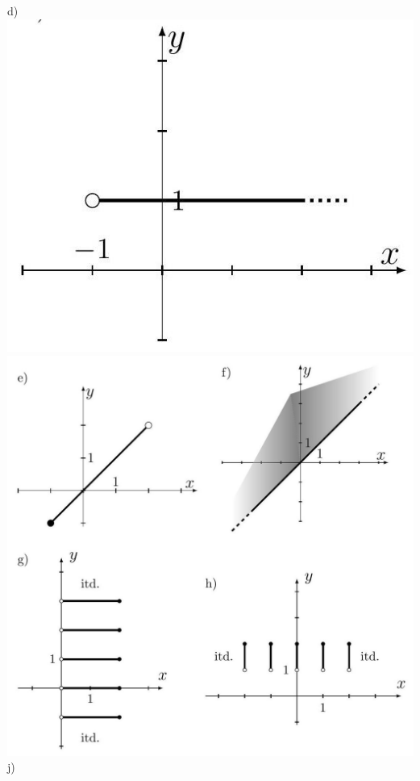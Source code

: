\documentclass[10pt]{article}
\begin{document}
\begin{enumerate}
d)\\
\includegraphics[max width=\textwidth, center]{2024_11_21_8f01584889ff06348ae7g-068(2)}\\
\includegraphics[max width=\textwidth, center]{2024_11_21_8f01584889ff06348ae7g-069(2)}\\
j)\\

\end{enumerate}
\end{document}
